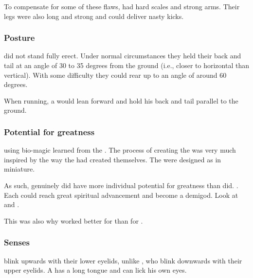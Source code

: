 To compensate for some of these flaws, \scathae had hard scales and strong arms. 
Their legs were also long and strong and could deliver nasty kicks. 





\subsubsection{Posture}
\Scathae did not stand fully erect. 
Under normal circumstances they held their back and tail at an angle of 30 to 35 degrees from the ground (i.e., closer to horizontal than vertical). 
With some difficulty they could rear up to an angle of around 60 degrees. 

When running, a \scatha would lean forward and hold his back and tail parallel to the ground. 





\subsubsection{Potential for greatness}
 using bio-magic learned from the \xss.
The process of creating the \scathae was very much inspired by the way the \dragons had created themselves.
The \scathae were designed as \dragons in miniature.

As such, \scathae genuinely did have more individual potential for greatness than \humans did.
.
Each \scatha could reach great spiritual advancement and become a demigod.
Look at  and . 

This was also why  worked better for \scathae than for \humans. 





\subsubsection{Senses}

\Scathae{} blink upwards with their lower eyelids, unlike \humans, who blink downwards with their upper eyelids. 
A \scatha{} has a long tongue and can lick his own eyes. 


